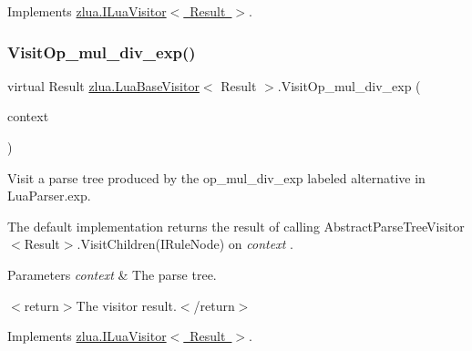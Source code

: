 Implements \mbox{\hyperlink{interfacezlua_1_1_i_lua_visitor_a5bb37038393d66e86ab98277a7df1f70}{zlua.\+I\+Lua\+Visitor$<$ Result $>$}}.

\mbox{\label{classzlua_1_1_lua_base_visitor_aeebcee477db462f0670252868b88fc35}} 
\subsubsection{\texorpdfstring{Visit\+Op\+\_\+mul\+\_\+div\+\_\+exp()}{VisitOp\_mul\_div\_exp()}}
{\footnotesize\ttfamily virtual Result \mbox{\hyperlink{classzlua_1_1_lua_base_visitor}{zlua.\+Lua\+Base\+Visitor}}$<$ Result $>$.Visit\+Op\+\_\+mul\+\_\+div\+\_\+exp (\begin{DoxyParamCaption}\item[{\mbox{[}\+Not\+Null\mbox{]} \mbox{\hyperlink{classzlua_1_1_lua_parser_1_1_op__mul__div__exp_context}{Lua\+Parser.\+Op\+\_\+mul\+\_\+div\+\_\+exp\+Context}}}]{context }\end{DoxyParamCaption})\hspace{0.3cm}{\ttfamily [virtual]}}



Visit a parse tree produced by the {\ttfamily op\+\_\+mul\+\_\+div\+\_\+exp} labeled alternative in Lua\+Parser.\+exp. 

The default implementation returns the result of calling Abstract\+Parse\+Tree\+Visitor$<$\+Result$>$.\+Visit\+Children(\+I\+Rule\+Node) on {\itshape context} . 


\begin{DoxyParams}{Parameters}
{\em context} & The parse tree.\\
\hline
\end{DoxyParams}
$<$return$>$The visitor result.$<$/return$>$ 

Implements \mbox{\hyperlink{interfacezlua_1_1_i_lua_visitor_acfc0ee7f37ae465d9690dcba6fac5a60}{zlua.\+I\+Lua\+Visitor$<$ Result $>$}}.

\mbox{\label{classzlua_1_1_lua_base_visitor_a46d6ab454b46b7fa9b6a2ebda7514299}} 
